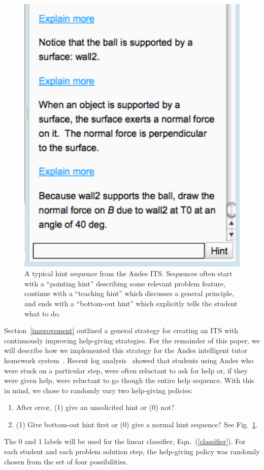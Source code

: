 \documentclass{edm_template}
\begin{document}
\begin{figure}
\centering    \includegraphics[scale=0.5]{andes-hint-sequence}
  \caption{A typical hint sequence from the Andes ITS. Sequences
    often start with a ``pointing hint'' describing some relevant problem
    feature, continue with a ``teaching hint'' which discusses a general principle,
    and ends with a ``bottom-out hint'' which explicitly tells the student
    what to do.}
         \label{hint-sequence}
\end{figure}

Section~\ref{improvement} outlined a general strategy for creating an
ITS with continuously improving help-giving strategies.  For the
remainder of this paper, we will describe how we implemented this
strategy for the Andes intelligent tutor homework system~\cite{vanlehn_andes_2005}.  
Recent log analysis~\cite{raj_paper} showed that students using Andes
who were stuck on a particular step, were often reluctant to ask for
help or, if they were given help, were reluctant to go though the entire help
sequence.  With this in mind, we chose to randomly vary two
help-giving policies: 
%
\begin{enumerate} 
\item After error, (1) give an unsolicited hint or (0) not?
\item (1) Give bottom-out hint first or (0) give a normal hint sequence? See Fig.~\ref{hint-sequence}.
\end{enumerate}
%
The 0 and 1 labels will be used for the linear classifier, Eqn.~(\ref{classifier}).
For each student and each
problem solution step, the help-giving policy was randomly chosen from
the set of four possibilities.
\end{document}

